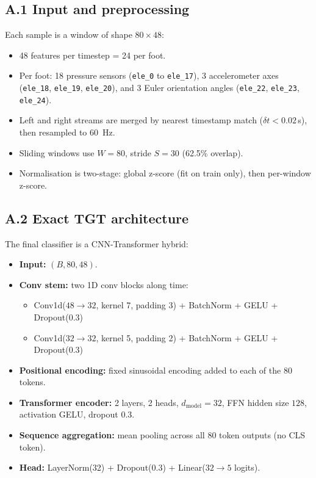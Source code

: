 \documentclass[10pt,a4paper,twocolumn]{article}
\begin{document}
\subsection*{A.1 Input and preprocessing}
Each sample is a window of shape $80 \times 48$:
\begin{itemize}[leftmargin=1.2em]
\item 48 features per timestep = 24 per foot.
\item Per foot: 18 pressure sensors (\texttt{ele\_0} to \texttt{ele\_17}), 3 accelerometer axes (\texttt{ele\_18}, \texttt{ele\_19}, \texttt{ele\_20}), and 3 Euler orientation angles (\texttt{ele\_22}, \texttt{ele\_23}, \texttt{ele\_24}).
\item Left and right streams are merged by nearest timestamp match ($\delta t < 0.02$\,s), then resampled to \SI{60}{Hz}.
\item Sliding windows use $W=80$, stride $S=30$ (62.5\% overlap).
\item Normalisation is two-stage: global z-score (fit on train only), then per-window z-score.
\end{itemize}

\subsection*{A.2 Exact TGT architecture}
The final classifier is a CNN-Transformer hybrid:
\begin{itemize}[leftmargin=1.2em]
\item \textbf{Input:} $(B, 80, 48)$.
\item \textbf{Conv stem:} two 1D conv blocks along time:
  \begin{itemize}
  \item Conv1d($48 \rightarrow 32$, kernel 7, padding 3) + BatchNorm + GELU + Dropout(0.3)
  \item Conv1d($32 \rightarrow 32$, kernel 5, padding 2) + BatchNorm + GELU + Dropout(0.3)
  \end{itemize}
\item \textbf{Positional encoding:} fixed sinusoidal encoding added to each of the 80 tokens.
\item \textbf{Transformer encoder:} 2 layers, 2 heads, $d_{\text{model}}=32$, FFN hidden size $128$, activation GELU, dropout 0.3.
\item \textbf{Sequence aggregation:} mean pooling across all 80 token outputs (no CLS token).
\item \textbf{Head:} LayerNorm(32) + Dropout(0.3) + Linear($32 \rightarrow 5$ logits).
\end{itemize}
\end{document}

